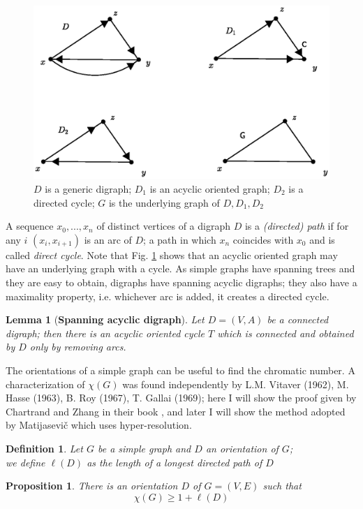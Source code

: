 \documentclass[a4paper,12pt,oneside]{book}
\newtheorem{proposition}[theorem]{Proposition}
\newtheorem{definition}[theorem]{Definition}
\newtheorem{lemma}[theorem]{Lemma}
\begin{document}
\begin{figure}[h]
\centering
\includegraphics[scale=0.55]{digraphs.eps}
\caption{$D$ is a generic digraph;
		$D_1$ is an acyclic oriented graph;
		$D_2$ is a directed cycle;
		$G$ is the underlying graph of $D,D_1,D_2$}\label{digraph}
\end{figure}


A sequence $x_0,...,x_n$ of distinct vertices of a digraph $D$ is a \textit{(directed) path} if for any $i$ $(x_i,x_{i+1})$ is an arc of $D$; a path in which $x_n$ coincides with $x_0$ and is called \textit{direct cycle}. Note that Fig. \ref{digraph} shows that an acyclic oriented graph may have an underlying graph with a cycle. As simple graphs have spanning trees and they are easy to obtain, digraphs have spanning acyclic digraphs; they also have a maximality property, i.e. whichever arc is added, it creates a directed cycle.

\newpage
\begin{lemma}[\textbf{Spanning acyclic digraph}]
Let $D=(V,A)$ be a connected digraph; then there is an acyclic oriented cycle $T$ which is connected and obtained by $D$ only by removing arcs.
\end{lemma}

The orientations of a simple graph can be useful to find the chromatic number. A characterization of $\chi (G)$ was found independently by L.M. Vitaver \cite{vitaver}(1962), M. Hasse \cite{hasse}(1963), B. Roy \cite{roy}(1967), T. Gallai \cite{gallai}(1969); here I will show the proof given by Chartrand and Zhang in their book \cite{chrom}, and later I will show the method adopted by Matijasevi\v{c} \cite{mat-1} which uses hyper-resolution.
\begin{definition}\label{prova}
Let $G$ be a simple graph and $D$ an orientation of $G$;\\ we define $\ell (D)$ as the length of a longest directed path of $D$
\end{definition}
\begin{proposition}\label{prop-vitaver-easy}
There is an orientation $D$ of $G=(V,E)$ such that $$ \chi (G) \geq 1+\ell(D) $$
\end{proposition}
\end{document}
